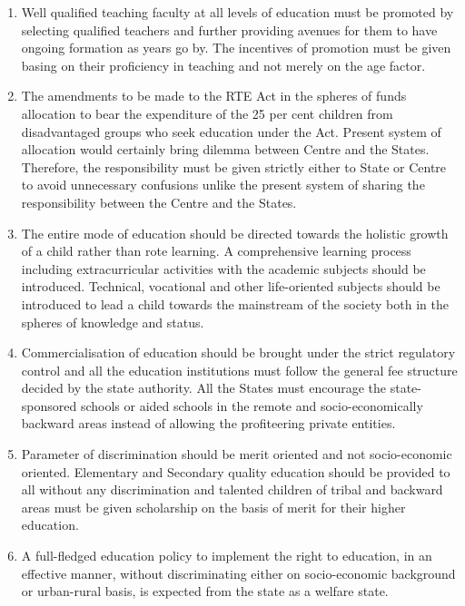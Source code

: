 \begin{multicols}{2}
\begin{enumerate}[label=$-$]
\item Well qualified teaching faculty at all levels of education must be promoted by
selecting qualified teachers and further providing avenues for them to have
ongoing formation as years go by. The incentives of promotion must be given
basing on their proficiency in teaching and not merely on the age factor.

\item The amendments to be made to the RTE Act in the spheres of funds allocation to
bear the expenditure of the 25 per cent children from disadvantaged groups who
seek education under the Act. Present system of allocation would certainly bring
dilemma between Centre and the States. Therefore, the responsibility must be
given strictly either to State or Centre to avoid unnecessary confusions unlike the
present system of sharing the responsibility between the Centre and the States.

\item The entire mode of education should be directed towards the holistic growth of a
child rather than rote learning. A comprehensive learning process including extracurricular activities with the academic subjects should be introduced. Technical, vocational and other life-oriented subjects should be introduced to lead a child
towards the mainstream of the society both in the spheres of knowledge and
status.

\item Commercialisation of education should be brought under the strict regulatory
control and all the education institutions must follow the general fee structure
decided by the state authority. All the States must encourage the state-sponsored
schools or aided schools in the remote and socio-economically backward areas
instead of allowing the profiteering private entities.

\item Parameter of discrimination should be merit oriented and not socio-economic
oriented. Elementary and Secondary quality education should be provided to all
without any discrimination and talented children of tribal and backward areas
must be given scholarship on the basis of merit for their higher education.

\item A full-fledged education policy to implement the right to education, in an
effective manner, without discriminating either on socio-economic background or
urban-rural basis, is expected from the state as a welfare state.
\end{enumerate}


\end{multicols}
